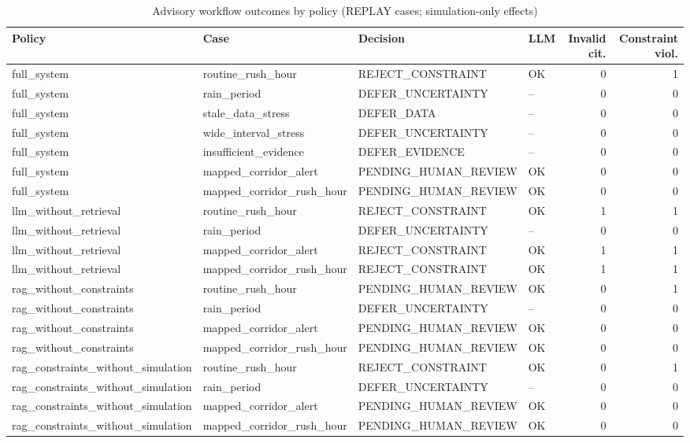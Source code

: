 \begin{table}[t]\centering\caption{Advisory workflow outcomes by policy (REPLAY cases; simulation-only effects)}\label{tab:adv}
\begin{tabular}{llllrr}\toprule Policy & Case & Decision & LLM & Invalid cit. & Constraint viol. \\ \midrule
full\_system & routine\_rush\_hour & REJECT\_CONSTRAINT & OK & 0 & 1 \\
full\_system & rain\_period & DEFER\_UNCERTAINTY & -- & 0 & 0 \\
full\_system & stale\_data\_stress & DEFER\_DATA & -- & 0 & 0 \\
full\_system & wide\_interval\_stress & DEFER\_UNCERTAINTY & -- & 0 & 0 \\
full\_system & insufficient\_evidence & DEFER\_EVIDENCE & -- & 0 & 0 \\
full\_system & mapped\_corridor\_alert & PENDING\_HUMAN\_REVIEW & OK & 0 & 0 \\
full\_system & mapped\_corridor\_rush\_hour & PENDING\_HUMAN\_REVIEW & OK & 0 & 0 \\
llm\_without\_retrieval & routine\_rush\_hour & REJECT\_CONSTRAINT & OK & 1 & 1 \\
llm\_without\_retrieval & rain\_period & DEFER\_UNCERTAINTY & -- & 0 & 0 \\
llm\_without\_retrieval & mapped\_corridor\_alert & REJECT\_CONSTRAINT & OK & 1 & 1 \\
llm\_without\_retrieval & mapped\_corridor\_rush\_hour & REJECT\_CONSTRAINT & OK & 1 & 1 \\
rag\_without\_constraints & routine\_rush\_hour & PENDING\_HUMAN\_REVIEW & OK & 0 & 1 \\
rag\_without\_constraints & rain\_period & DEFER\_UNCERTAINTY & -- & 0 & 0 \\
rag\_without\_constraints & mapped\_corridor\_alert & PENDING\_HUMAN\_REVIEW & OK & 0 & 0 \\
rag\_without\_constraints & mapped\_corridor\_rush\_hour & PENDING\_HUMAN\_REVIEW & OK & 0 & 0 \\
rag\_constraints\_without\_simulation & routine\_rush\_hour & REJECT\_CONSTRAINT & OK & 0 & 1 \\
rag\_constraints\_without\_simulation & rain\_period & DEFER\_UNCERTAINTY & -- & 0 & 0 \\
rag\_constraints\_without\_simulation & mapped\_corridor\_alert & PENDING\_HUMAN\_REVIEW & OK & 0 & 0 \\
rag\_constraints\_without\_simulation & mapped\_corridor\_rush\_hour & PENDING\_HUMAN\_REVIEW & OK & 0 & 0 \\
\bottomrule\end{tabular}\end{table}
